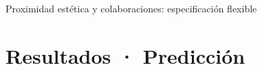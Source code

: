 \documentclass[
  8pt,
  ignorenonframetext,
  aspectratio=169,
  spanish,
]{beamer}
\newcommand{\roadmapcontent}{}
\begin{document}
\begin{frame}{Proximidad estética y colaboraciones: especificación
flexible}
\gdef\roadmapcontent{{\scriptsize \mbox{\color{black!40}Parte 1 · Currículum}\quad \mbox{\color{black!40}Parte 2 · Propuesta docente}\quad \mbox{\color{mDarkTeal}\bfseries Parte 3 · Propuesta investigadora: Creative collaborations}\par}
\vspace{0.8em}
{\large \mbox{\color{black!40}Motivación y contexto}~· \mbox{\color{black!40}Datos y diseño}~· \mbox{\color{mDarkTeal}\bfseries Resultados}~· \mbox{\color{black!40}Conclusiones}\par}
\vspace{0.2em}
\hspace{1.5em}{\normalsize \mbox{\color{black!40}Modelo base}~· \mbox{\color{mDarkTeal}\bfseries Predicción}~· \mbox{\color{black!40}Sensibilidad}\par}}
\end{frame}

\section{Resultados · Predicción}\label{resultados-predicciuxf3n}
\end{document}
